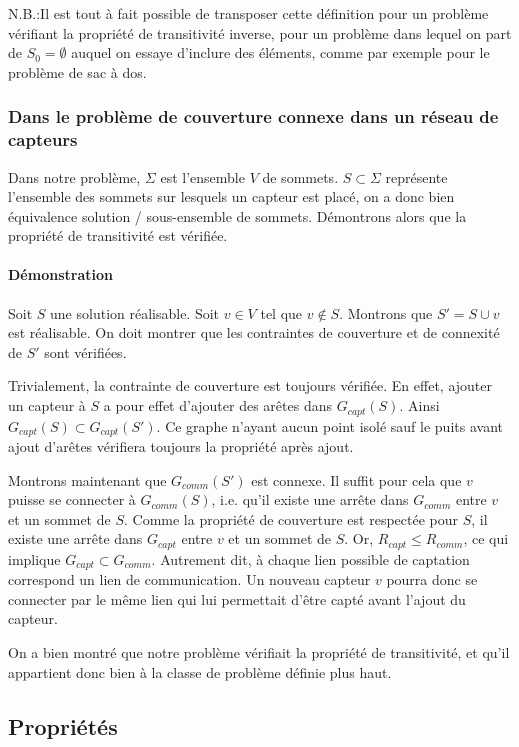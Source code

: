 \documentclass[12pt,a4paper]{article}
\begin{document}
N.B.:Il est tout à fait possible de transposer cette définition pour un problème vérifiant la propriété de transitivité inverse, pour un problème dans lequel on part de $S_0=\emptyset$ auquel on essaye d'inclure des éléments, comme par exemple pour le problème de sac à dos.

\subsubsection{Dans le problème de couverture connexe dans un réseau de capteurs}
Dans notre problème, $\Sigma$ est l'ensemble $V$ de sommets. $S\subset \Sigma$ représente l'ensemble des sommets sur lesquels un capteur est placé, on a donc bien équivalence solution / sous-ensemble de sommets. Démontrons alors que la propriété de transitivité est vérifiée.
\paragraph{Démonstration}
Soit $S$ une solution réalisable. Soit $v \in V$ tel que $v\notin   S$. Montrons que $S'=S\cup v$ est réalisable. On doit montrer que les contraintes de couverture et de connexité de $S'$ sont vérifiées.

Trivialement, la contrainte de couverture est toujours vérifiée. En effet, ajouter un capteur à $S$ a pour effet d'ajouter des arêtes dans $G_{capt}(S)$. Ainsi $G_{capt}(S)\subset G_{capt}(S')$. Ce graphe n'ayant aucun point isolé sauf le puits avant ajout d'arêtes vérifiera toujours la propriété après ajout. 

Montrons maintenant que $G_{comm}(S')$ est connexe. Il suffit pour cela que $v$ puisse se connecter à $G_{comm}(S)$, i.e. qu'il existe une arrête dans $G_{comm}$ entre $v$ et un sommet de $S$. Comme la propriété de couverture est respectée pour $S$, il existe une arrête dans $G_{capt}$ entre $v$ et un sommet de $S$. Or, $R_{capt}\leq R_{comm}$, ce qui implique $G_{capt}\subset G_{comm}$. Autrement dit, à chaque lien possible de captation correspond un lien de communication. Un nouveau capteur $v$ pourra donc se connecter par le même lien qui lui permettait d'être capté avant l'ajout du capteur.

On a bien montré que notre problème vérifiait la propriété de transitivité, et qu'il appartient donc bien à la classe de problème définie plus haut.

\subsection{Propriétés}
\end{document}
